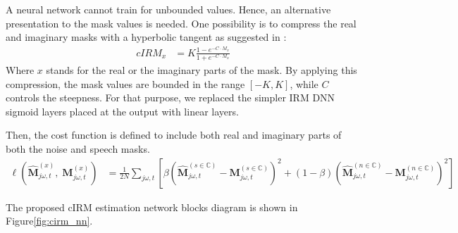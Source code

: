 A neural network cannot train for unbounded values. 
Hence, an alternative presentation to the mask values is needed.
One possibility is to compress the real and imaginary masks
with a hyperbolic tangent as suggested in \cite{7364200}: 
\begin{align}\label{eq:cirm_compress}
    cIRM_{x} &= K \frac{1-e^{-C\cdot M_{x}}}{1+e^{-C\cdot M_{x}}}
\end{align}
Where \(x\) stands for the real or the imaginary parts of the mask.
By applying this compression, the mask values are bounded in
the range \([-K, K]\), while \(C\) controls the steepness.
For that purpose, we replaced the 
simpler IRM DNN sigmoid layers placed at the output 
with linear layers.

Then, the cost function is defined to include both real and imaginary parts
of both the noise and speech masks. 
\begin{align}
    \ell(\mathbf{\widehat{M}}^{(x)}_{j\omega, t},\;\mathbf{M}^{(x)}_{j\omega, t}) & = 
        \frac{1}{2N}\sum_{j\omega, t}
        \left[ 
            \beta\!\left( 
                \mathbf{\widehat{M}}^{(s \in \mathbb{C})}_{j\omega, t} - 
                \mathbf{M}^{(s \in \mathbb{C})}_{j\omega, t} 
            \right)^{2} 
            + \left( 1- \beta \right)\!
            \left(
                \mathbf{\widehat{M}}^{(n \in \mathbb{C})}_{j\omega, t} - 
                \mathbf{M}^{(n \in \mathbb{C})}_{j\omega, t} 
            \right)^{2} 
        \right]
\end{align}

The proposed cIRM estimation network blocks 
diagram is shown in Figure\;\ref{fig:cirm_nn}.

